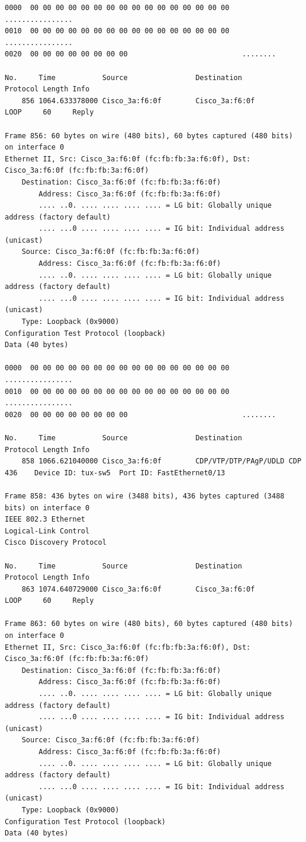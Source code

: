 \documentclass[a4paper,11pt]{article}
\begin{document}
\begin{lstlisting}
0000  00 00 00 00 00 00 00 00 00 00 00 00 00 00 00 00   ................
0010  00 00 00 00 00 00 00 00 00 00 00 00 00 00 00 00   ................
0020  00 00 00 00 00 00 00 00                           ........

No.     Time           Source                Destination           Protocol Length Info
    856 1064.633378000 Cisco_3a:f6:0f        Cisco_3a:f6:0f        LOOP     60     Reply

Frame 856: 60 bytes on wire (480 bits), 60 bytes captured (480 bits) on interface 0
Ethernet II, Src: Cisco_3a:f6:0f (fc:fb:fb:3a:f6:0f), Dst: Cisco_3a:f6:0f (fc:fb:fb:3a:f6:0f)
    Destination: Cisco_3a:f6:0f (fc:fb:fb:3a:f6:0f)
        Address: Cisco_3a:f6:0f (fc:fb:fb:3a:f6:0f)
        .... ..0. .... .... .... .... = LG bit: Globally unique address (factory default)
        .... ...0 .... .... .... .... = IG bit: Individual address (unicast)
    Source: Cisco_3a:f6:0f (fc:fb:fb:3a:f6:0f)
        Address: Cisco_3a:f6:0f (fc:fb:fb:3a:f6:0f)
        .... ..0. .... .... .... .... = LG bit: Globally unique address (factory default)
        .... ...0 .... .... .... .... = IG bit: Individual address (unicast)
    Type: Loopback (0x9000)
Configuration Test Protocol (loopback)
Data (40 bytes)

0000  00 00 00 00 00 00 00 00 00 00 00 00 00 00 00 00   ................
0010  00 00 00 00 00 00 00 00 00 00 00 00 00 00 00 00   ................
0020  00 00 00 00 00 00 00 00                           ........

No.     Time           Source                Destination           Protocol Length Info
    858 1066.621040000 Cisco_3a:f6:0f        CDP/VTP/DTP/PAgP/UDLD CDP      436    Device ID: tux-sw5  Port ID: FastEthernet0/13  

Frame 858: 436 bytes on wire (3488 bits), 436 bytes captured (3488 bits) on interface 0
IEEE 802.3 Ethernet 
Logical-Link Control
Cisco Discovery Protocol

No.     Time           Source                Destination           Protocol Length Info
    863 1074.640729000 Cisco_3a:f6:0f        Cisco_3a:f6:0f        LOOP     60     Reply

Frame 863: 60 bytes on wire (480 bits), 60 bytes captured (480 bits) on interface 0
Ethernet II, Src: Cisco_3a:f6:0f (fc:fb:fb:3a:f6:0f), Dst: Cisco_3a:f6:0f (fc:fb:fb:3a:f6:0f)
    Destination: Cisco_3a:f6:0f (fc:fb:fb:3a:f6:0f)
        Address: Cisco_3a:f6:0f (fc:fb:fb:3a:f6:0f)
        .... ..0. .... .... .... .... = LG bit: Globally unique address (factory default)
        .... ...0 .... .... .... .... = IG bit: Individual address (unicast)
    Source: Cisco_3a:f6:0f (fc:fb:fb:3a:f6:0f)
        Address: Cisco_3a:f6:0f (fc:fb:fb:3a:f6:0f)
        .... ..0. .... .... .... .... = LG bit: Globally unique address (factory default)
        .... ...0 .... .... .... .... = IG bit: Individual address (unicast)
    Type: Loopback (0x9000)
Configuration Test Protocol (loopback)
Data (40 bytes)


\end{lstlisting}
\end{document}
